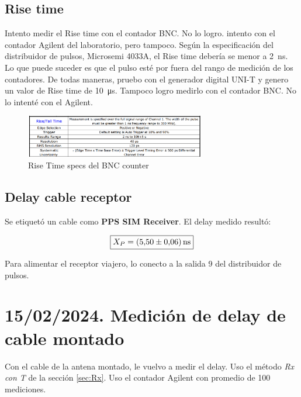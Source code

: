 \documentclass[11pt]{article}
\begin{document}
\subsection{Rise time}
Intento medir el Rise time con el contador BNC. No lo logro. intento con el contador Agilent del laboratorio, pero tampoco. Según la especificación del distribuidor de pulsos, Microsemi 4033A, el Rise time debería se menor a \SI{2}{\nano\second}. Lo que puede suceder es que el pulso esté por fuera del rango de medición de los contadores. De todas maneras, pruebo con el generador digital UNI-T y genero un valor de Rise time de \SI{10}{\micro\second}. Tampoco logro medirlo con el contador BNC. No lo intenté con el Agilent.

\begin{figure}[ht]
    \begin{center}
        \includegraphics[width=0.7\textwidth]{./figuras/RiseTimeSpecsBNC}
        \caption{Rise Time specs del BNC counter}
    \end{center}
\end{figure}

\subsection{Delay cable receptor}
Se etiquetó un cable como \textbf{PPS SIM Receiver}. El delay medido resultó:


\begin{equation}
\boxed{X_{P}=\SI{5.5(0,06)}{\nano\second}}%
\end{equation}

Para alimentar el receptor viajero, lo conecto a la salida 9 del distribuidor de pulsos.

\section{15/02/2024. Medición de delay de cable montado}

Con el cable de la antena montado, le vuelvo a medir el delay. Uso el método \textit{Rx con T} de la sección  \ref{sec:Rx}. Uso el contador Agilent con promedio de 100 mediciones.
\end{document}
